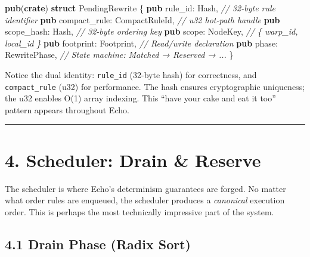 \documentclass[11pt]{book}
\newenvironment{Shaded}{}{}
\newcommand{\BuiltInTok}[1]{\textcolor[rgb]{0.00,0.50,0.00}{#1}}
\newcommand{\CommentTok}[1]{\textcolor[rgb]{0.38,0.63,0.69}{\textit{#1}}}
\newcommand{\KeywordTok}[1]{\textcolor[rgb]{0.00,0.44,0.13}{\textbf{#1}}}
\newcommand{\NormalTok}[1]{#1}
\newcommand{\OperatorTok}[1]{\textcolor[rgb]{0.40,0.40,0.40}{#1}}
\begin{document}
\begin{Shaded}
\begin{Highlighting}[]
\KeywordTok{pub}\NormalTok{(}\KeywordTok{crate}\NormalTok{) }\KeywordTok{struct}\NormalTok{ PendingRewrite }\OperatorTok{\{}
    \KeywordTok{pub}\NormalTok{ rule\_id}\OperatorTok{:} \BuiltInTok{Hash}\OperatorTok{,}              \CommentTok{// 32{-}byte rule identifier}
    \KeywordTok{pub}\NormalTok{ compact\_rule}\OperatorTok{:}\NormalTok{ CompactRuleId}\OperatorTok{,} \CommentTok{// u32 hot{-}path handle}
    \KeywordTok{pub}\NormalTok{ scope\_hash}\OperatorTok{:} \BuiltInTok{Hash}\OperatorTok{,}           \CommentTok{// 32{-}byte ordering key}
    \KeywordTok{pub}\NormalTok{ scope}\OperatorTok{:}\NormalTok{ NodeKey}\OperatorTok{,}             \CommentTok{// \{ warp\_id, local\_id \}}
    \KeywordTok{pub}\NormalTok{ footprint}\OperatorTok{:}\NormalTok{ Footprint}\OperatorTok{,}       \CommentTok{// Read/write declaration}
    \KeywordTok{pub}\NormalTok{ phase}\OperatorTok{:}\NormalTok{ RewritePhase}\OperatorTok{,}        \CommentTok{// State machine: Matched → Reserved → ...}
\OperatorTok{\}}
\end{Highlighting}
\end{Shaded}

\begin{tourguide}
Notice the dual identity: \texttt{rule\_id} (32-byte hash) for correctness, and \texttt{compact\_rule} (u32) for performance. The hash ensures cryptographic uniqueness; the u32 enables O(1) array indexing. This ``have your cake and eat it too'' pattern appears throughout Echo.
\end{tourguide}

\begin{center}\rule{0.5\linewidth}{0.5pt}\end{center}

\section{4. Scheduler: Drain \& Reserve}\label{scheduler-drain-reserve}

\begin{tourguide}
The scheduler is where Echo's determinism guarantees are forged. No matter what order rules are enqueued, the scheduler produces a \emph{canonical} execution order. This is perhaps the most technically impressive part of the system.
\end{tourguide}

\subsection{4.1 Drain Phase (Radix Sort)}\label{drain-phase-radix-sort}
\end{document}
